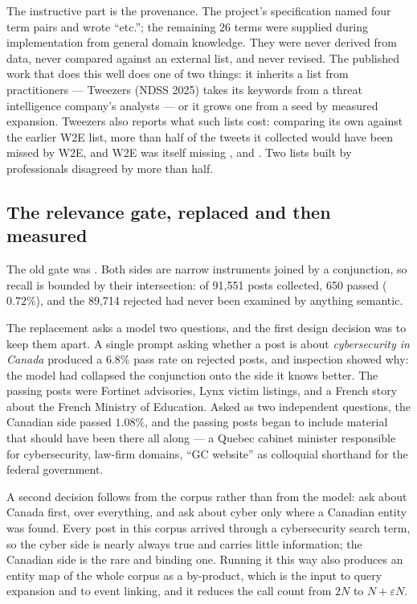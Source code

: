 \documentclass[11pt]{article}
\begin{document}
\begin{warnbox}
The instructive part is the provenance. The project's specification named four
term pairs and wrote ``etc.''; the remaining 26 terms were supplied during
implementation from general domain knowledge. They were never derived from
data, never compared against an external list, and never revised. The
published work that does this well does one of two things: it inherits a list
from practitioners --- Tweezers (NDSS 2025) takes its keywords from a threat
intelligence company's analysts --- or it grows one from a seed by measured
expansion. Tweezers also reports what such lists cost: comparing its own
against the earlier W2E list, more than half of the tweets it collected would
have been missed by W2E, and W2E was itself missing ,
 and . Two lists built by professionals disagreed by more
than half.
\end{warnbox}

\subsection{The relevance gate, replaced and then measured}

The old gate was
.
Both sides are narrow instruments joined by a conjunction, so recall is
bounded by their intersection: of 91{,}551 posts collected, 650 passed
($0.72\%$), and the 89{,}714 rejected had never been examined by anything
semantic.

The replacement asks a model two questions, and the first design decision was
to keep them apart. A single prompt asking whether a post is about
\emph{cybersecurity in Canada} produced a $6.8\%$ pass rate on rejected posts,
and inspection showed why: the model had collapsed the conjunction onto the
side it knows better. The passing posts were Fortinet advisories, Lynx victim
listings, and a French story about the French Ministry of Education. Asked as
two independent questions, the Canadian side passed $1.08\%$, and the passing
posts began to include material that should have been there all along --- a
Quebec cabinet minister responsible for cybersecurity,  law-firm
domains, ``GC website'' as colloquial shorthand for the federal government.

A second decision follows from the corpus rather than from the model: ask
about Canada first, over everything, and ask about cyber only where a Canadian
entity was found. Every post in this corpus arrived through a cybersecurity
search term, so the cyber side is nearly always true and carries little
information; the Canadian side is the rare and binding one. Running it this
way also produces an entity map of the whole corpus as a by-product, which is
the input to query expansion and to event linking, and it reduces the call
count from $2N$ to $N + \varepsilon N$.
\end{document}
